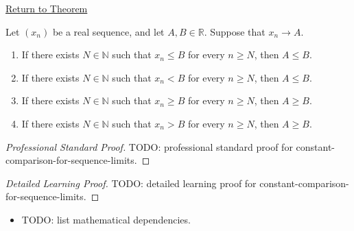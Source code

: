 \newpage
{}
\label{prf:constant-comparison-sequence-limits}

\begin{remark*}[Return]
\hyperref[thm:constant-comparison-sequence-limits]{Return to Theorem}
\end{remark*}

\begin{theorem*}
Let $(x_n)$ be a real sequence, and let $A,B\in\mathbb{R}$. Suppose
that $x_n\to A$.
\begin{enumerate}[label=(\alph*)]
  \item If there exists $N\in\mathbb{N}$ such that $x_n\le B$ for every
  $n\ge N$, then $A\le B$.
  \item If there exists $N\in\mathbb{N}$ such that $x_n<B$ for every
  $n\ge N$, then $A\le B$.
  \item If there exists $N\in\mathbb{N}$ such that $x_n\ge B$ for every
  $n\ge N$, then $A\ge B$.
  \item If there exists $N\in\mathbb{N}$ such that $x_n>B$ for every
  $n\ge N$, then $A\ge B$.
\end{enumerate}

\smallskip
\noindent
\end{theorem*}

\begin{proof}[Professional Standard Proof]
\LRAProofBodyStart
TODO: professional standard proof for constant-comparison-for-sequence-limits.
\end{proof}

\begin{proof}[Detailed Learning Proof]
\LRAProofBodyStart
TODO: detailed learning proof for constant-comparison-for-sequence-limits.
\end{proof}

\begin{remark*}
\end{remark*}

\begin{dependencies}
\begin{itemize}
  \item TODO: list mathematical dependencies.
\end{itemize}
\end{dependencies}

\clearpage
